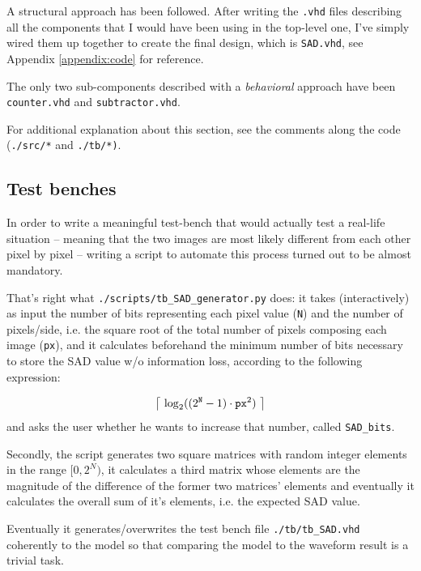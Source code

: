 \documentclass[12pt, a4paper]{article}
\DeclarePairedDelimiter\ceil{\lceil}{\rceil}
\begin{document}
A structural approach has been followed.
After writing the \texttt{.vhd} files describing all the components that I would have been using in the top-level one, I've simply wired them up together to create the final design, which is \texttt{SAD.vhd}, see Appendix \ref{appendix:code} for reference.

The only two sub-components described with a \textit{behavioral} approach have been \texttt{counter.vhd} and \texttt{subtractor.vhd}. 

For additional explanation about this section, see the comments along the code (\texttt{./src/*} and \texttt{./tb/*)}.



\subsection{Test benches}

In order to write a meaningful test-bench that would actually test a real-life situation -- meaning that the two images are most likely different from each other pixel by pixel -- writing a script to automate this process turned out to be almost mandatory.

That's right what \texttt{./scripts/tb\_SAD\_generator.py} does: it takes (interactively) as input the number of bits representing each pixel value (\texttt{N}) and the number of pixels/side, i.e. the square root of the total number of pixels composing each image (\texttt{px}), and it calculates beforehand the minimum number of bits necessary to store the SAD value w/o information loss, according to the following expression: 

\begin{equation}
    \ceil[\big]{\ \log_2( (2^\texttt{N}-1) \cdot \texttt{px}^2 )\ } 
\end{equation}
and asks the user whether he wants to increase that number, called \texttt{SAD\_bits}.
\newline

Secondly, the script generates two square matrices with random integer elements in the range $[0, 2^N)$, it calculates a third matrix whose elements are the magnitude of the difference of the former two matrices' elements and eventually it calculates the overall sum of it's elements, i.e. the expected SAD value.
\newline

Eventually it generates/overwrites the test bench file \texttt{./tb/tb\_SAD.vhd} coherently to the model so that comparing the model to the waveform result is a trivial task.
\newline
\end{document}
